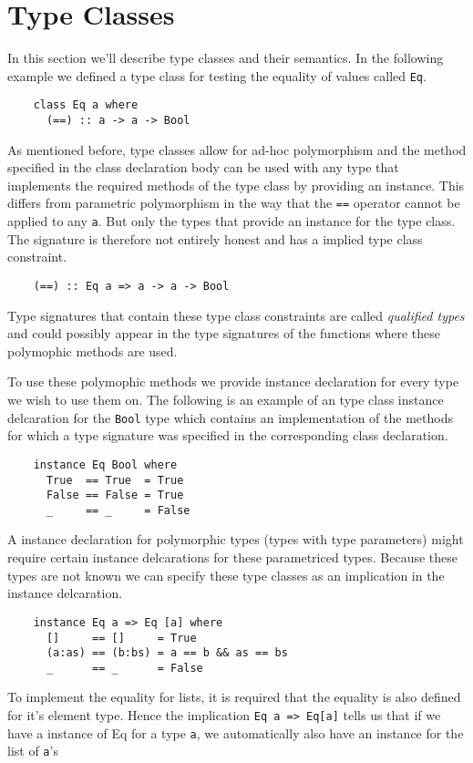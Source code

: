 \section{Type Classes}
In this section we'll describe type classes and their semantics. In the
following example we defined a type class for testing the equality of values
called \texttt{Eq}.

\begin{verbatim}
    class Eq a where
      (==) :: a -> a -> Bool
\end{verbatim}

As mentioned before, type classes allow for ad-hoc polymorphism and the method
specified in the class declaration body can be used with any type that
implements the required methods of the type class by providing an instance.
This differs from parametric polymorphism in the way that the \texttt{==}
operator cannot be applied to any \texttt{a}. But only the types that provide an
instance for the type class. The signature is therefore not entirely honest and
has a implied type class constraint.
\begin{verbatim}
    (==) :: Eq a => a -> a -> Bool
\end{verbatim}
Type signatures that contain these type class constraints are called
\textit{qualified types} and could possibly appear in the type signatures of the
functions where these polymophic methods are used.

To use these polymophic methods we provide instance declaration for every type
we wish to use them on. The following is an example of an type class instance
delcaration for the \texttt{Bool} type which contains an implementation of the
methods for which a type signature was specified in the corresponding class
declaration.
\begin{verbatim}
    instance Eq Bool where
      True  == True  = True
      False == False = True
      _     == _     = False
\end{verbatim}

A instance declaration for polymorphic types (types with type parameters) might
require certain instance delcarations for these parametriced types. Because
these types are not known we can specify these type classes as an implication in
the instance delcaration.
\begin{verbatim}
    instance Eq a => Eq [a] where
      []     == []     = True
      (a:as) == (b:bs) = a == b && as == bs
      _      == _      = False
\end{verbatim}
To implement the equality for lists, it is required that the equality is also
defined for it's element type. Hence the implication \texttt{Eq a => Eq[a]}
tells us that if we have a instance of Eq for a type \texttt{a}, we
automatically also have an instance for the list of \texttt{a}'s

